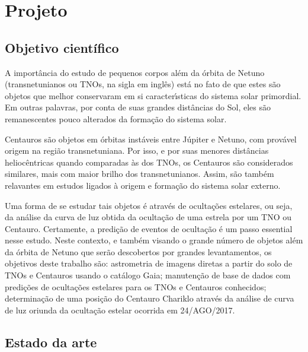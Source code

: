 \documentclass[a4paper, 11pt]{article}
\begin{document}
\renewcommand{\figurename}{\textsc{Figura}}
\renewcommand{\tablename}{\textsc{Tabela}}
\renewcommand{\refname}{Refer\^encias}




\section{Projeto}

\subsection{Objetivo científico}

A importância do estudo de pequenos corpos al\'em da \'orbita de Netuno (transnetunianos ou TNOs, na sigla em ingl\^es) est\'a no fato de que estes s\~ao objetos que melhor conservaram em si caracter\'{\i}sticas do sistema solar primordial. Em outras palavras, por conta de suas grandes dist\^ancias do Sol, eles s\~ao remanescentes pouco alterados da forma\c c\~ao do sistema solar.

Centauros s\~ao objetos em \'orbitas inst\'aveis entre J\'upiter e Netuno, com prov\'avel origem na regi\~ao transnetuniana. Por isso, e por suas menores dist\^ancias helioc\^entricas quando comparadas \`as dos TNOs, os Centauros s\~ao considerados similares, mais com maior brilho dos transnetunianos. Assim, s\~ao tamb\'em relavantes em estudos ligados \`a origem e forma\c c\~ao do sistema solar externo.

Uma forma de se estudar tais objetos \'e atrav\'es de oculta\c c\~oes estelares, ou seja, da an\'alise da curva de luz obtida da oculta\c c\~ao de uma estrela por um TNO ou Centauro. Certamente, a predi\c c\~ao de eventos de oculta\c c\~ao \'e um passo essential nesse estudo. Neste contexto, e tamb\'em visando o grande n\'umero de objetos al\'em da \'orbita de Netuno que ser\~ao descobertos por grandes levantamentos, os objetivos deste trabalho s\~ao: astrometria de imagens diretas a partir do solo de TNOs e Centauros usando o cat\'alogo Gaia; manuten\c c\~ao de base de dados com predi\c c\~oes de oculta\c c\~oes estelares para os TNOs e Centauros conhecidos; determina\c c\~ao de uma posi\c c\~ao do Centauro Chariklo atrav\'es da an\'alise de curva de luz oriunda da  oculta\c c\~ao estelar ocorrida em 24/AGO/2017.

\subsection{Estado da arte}
\end{document}
